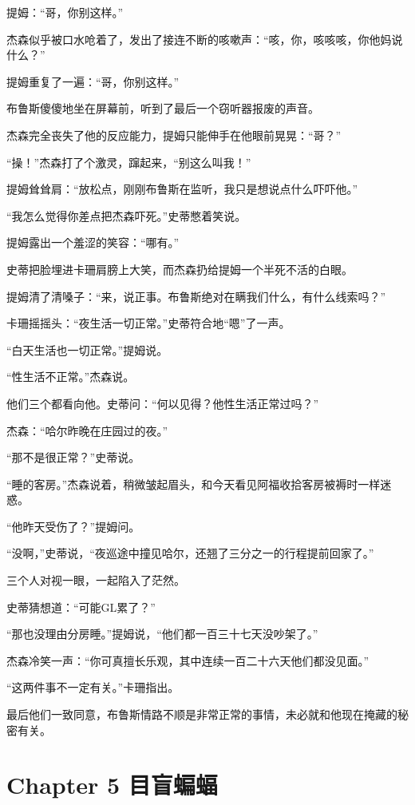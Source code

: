 \documentclass[../main.tex]{subfiles}
\begin{document}
提姆：“哥，你别这样。”

杰森似乎被口水呛着了，发出了接连不断的咳嗽声：“咳，你，咳咳咳，你他妈说什么？”

提姆重复了一遍：“哥，你别这样。”

布鲁斯傻傻地坐在屏幕前，听到了最后一个窃听器报废的声音。

杰森完全丧失了他的反应能力，提姆只能伸手在他眼前晃晃：“哥？”

“操！”杰森打了个激灵，蹿起来，“别这么叫我！”

提姆耸耸肩：“放松点，刚刚布鲁斯在监听，我只是想说点什么吓吓他。”

“我怎么觉得你差点把杰森吓死。”史蒂憋着笑说。

提姆露出一个羞涩的笑容：“哪有。”

史蒂把脸埋进卡珊肩膀上大笑，而杰森扔给提姆一个半死不活的白眼。

提姆清了清嗓子：“来，说正事。布鲁斯绝对在瞒我们什么，有什么线索吗？”

卡珊摇摇头：“夜生活一切正常。”史蒂符合地“嗯”了一声。

“白天生活也一切正常。”提姆说。

“性生活不正常。”杰森说。

他们三个都看向他。史蒂问：“何以见得？他性生活正常过吗？”

杰森：“哈尔昨晚在庄园过的夜。”

“那不是很正常？”史蒂说。

“睡的客房。”杰森说着，稍微皱起眉头，和今天看见阿福收拾客房被褥时一样迷惑。

“他昨天受伤了？”提姆问。

“没啊，”史蒂说，“夜巡途中撞见哈尔，还翘了三分之一的行程提前回家了。”

三个人对视一眼，一起陷入了茫然。

史蒂猜想道：“可能GL累了？”

“那也没理由分房睡。”提姆说，“他们都一百三十七天没吵架了。”

杰森冷笑一声：“你可真擅长乐观，其中连续一百二十六天他们都没见面。”

“这两件事不一定有关。”卡珊指出。

最后他们一致同意，布鲁斯情路不顺是非常正常的事情，未必就和他现在掩藏的秘密有关。

\section*{Chapter 5\hspace{1em} 目盲蝙蝠}
\end{document}
